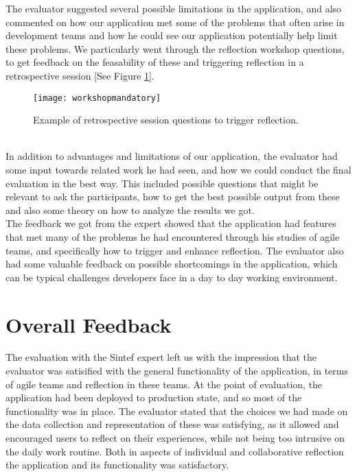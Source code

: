 The evaluator suggested several possible limitations in the application, and also commented on how our application met some of the problems that often arise in development teams and how he could see our application potentially help limit these problems. We particularly went through the reflection workshop questions, to get feedback on the feasability of these and triggering reflection in a retrospective session [See Figure \ref{workshopmandatoryexpertreview}]. 
\begin{figure}[h!]
    \centering
        \texttt{[image: workshopmandatory]}
    \caption{Example of retrospective session questions to trigger reflection.}
    \label{workshopmandatoryexpertreview}
\end{figure}
\\
In addition to advantages and limitations of our application, the evaluator had some input towards related work he had seen, and how we could conduct the final evaluation in the best way. This included possible questions that might be relevant to ask the participants, how to get the best possible output from these and also some theory on how to analyze the results we got. \\
The feedback we got from the expert showed that the application had features that met many of the problems he had encountered through his studies of agile teams, and specifically how to trigger and enhance reflection. The evaluator also had some valuable feedback on possible shortcomings in the application, which can be typical challenges developers face in a day to day working environment. 

\section{Overall Feedback}
The evaluation with the Sintef expert left us with the impression that the evaluator was satisified with the general functionality of the application, in terms of agile teams and reflection in these teams. 
At the point of evaluation, the application had been deployed to production state, and so most of the functionality was in place. The evaluator stated that the choices we had made on the data collection and representation of these was satisfying, as it allowed and encouraged users to reflect on their experiences, while not being too intrusive on the daily work routine. Both in aspects of individual and collaborative reflection the application and its functionality was satisfactory. \\

